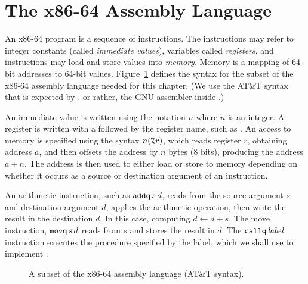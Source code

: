 \documentclass[12pt]{book}
\begin{document}
\section{The x86-64 Assembly Language}
\label{sec:x86-64}

An x86-64 program is a sequence of instructions. The instructions may
refer to integer constants (called \emph{immediate values}), variables
called \emph{registers}, and instructions may load and store values
into \emph{memory}.  Memory is a mapping of 64-bit addresses to 64-bit
values. Figure~\ref{fig:x86-a} defines the syntax for the subset of
the x86-64 assembly language needed for this chapter.  (We use the
AT\&T syntax that is expected by , or rather, the GNU
assembler inside .)

An immediate value is written using the notation \key{\$}$n$ where $n$
is an integer. 
%
A register is written with a \key{\%} followed by the register name,
such as .
%
An access to memory is specified using the syntax $n(\texttt{\%}r)$,
which reads register $r$, obtaining address $a$, and then offsets the
address by $n$ bytes (8 bits), producing the address $a + n$. The
address is then used to either load or store to memory depending on
whether it occurs as a source or destination argument of an
instruction.

An arithmetic instruction, such as $\texttt{addq}\,s\,d$, reads from the
source argument $s$ and destination argument $d$, applies the
arithmetic operation, then write the result in the destination $d$. In
this case, computing $d \gets d + s$.
%
The move instruction, $\texttt{movq}\,s\,d$ reads from $s$ and stores the
result in $d$. 
%
The $\texttt{callq}\,\mathit{label}$ instruction executes the procedure
specified by the label, which we shall use to implement
. 

\begin{figure}[tbp]
\caption{A subset of the x86-64 assembly language (AT\&T syntax).}
\label{fig:x86-a}
\end{figure}
\end{document}
